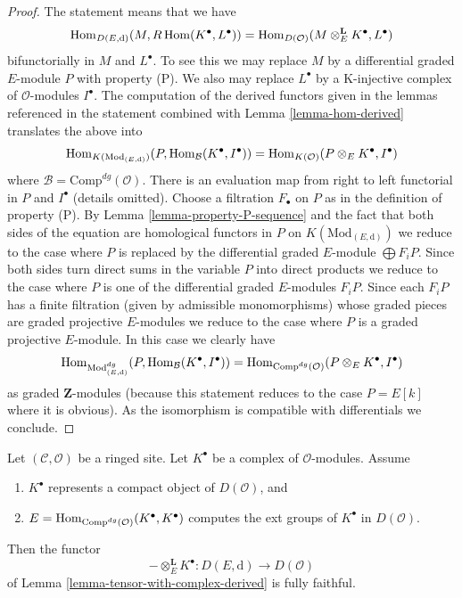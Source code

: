 \begin{proof}
The statement means that we have
$$
\mathop{\mathrm{Hom}}\nolimits_{D(E, \text{d})}(M, R\mathop{\mathrm{Hom}}\nolimits(K^\bullet, L^\bullet)) =
\mathop{\mathrm{Hom}}\nolimits_{D(\mathcal{O})}(M \otimes^\mathbf{L}_E K^\bullet, L^\bullet)
$$
bifunctorially in $M$ and $L^\bullet$. To see this we may replace $M$
by a differential graded $E$-module $P$ with property (P).
We also may replace $L^\bullet$ by a K-injective complex of
$\mathcal{O}$-modules $I^\bullet$. The computation
of the derived functors given in the lemmas referenced in the statement
combined with Lemma \ref{lemma-hom-derived} translates the above into
$$
\mathop{\mathrm{Hom}}\nolimits_{K(\text{Mod}_{(E, \text{d})})}
(P, \mathop{\mathrm{Hom}}\nolimits_\mathcal{B}(K^\bullet, I^\bullet)) =
\mathop{\mathrm{Hom}}\nolimits_{K(\mathcal{O})}(P \otimes_E K^\bullet, I^\bullet)
$$
where $\mathcal{B} = \text{Comp}^{dg}(\mathcal{O})$. 
There is an evaluation map from right to left functorial
in $P$ and $I^\bullet$ (details omitted).
Choose a filtration $F_\bullet$ on $P$ as in the definition of property (P).
By Lemma \ref{lemma-property-P-sequence} and the fact that
both sides of the equation are homological functors in $P$
on $K(\text{Mod}_{(E, \text{d})})$
we reduce to the case where $P$ is replaced by
the differential graded $E$-module $\bigoplus F_iP$.
Since both sides turn direct sums in the variable $P$
into direct products we reduce to the case where $P$ is one of the
differential graded $E$-modules $F_iP$.
Since each $F_iP$ has a finite filtration (given by admissible
monomorphisms) whose graded pieces are graded projective $E$-modules
we reduce to the case where $P$ is a graded projective $E$-module.
In this case we clearly have
$$
\mathop{\mathrm{Hom}}\nolimits_{\text{Mod}^{dg}_{(E, \text{d})}}
(P, \mathop{\mathrm{Hom}}\nolimits_\mathcal{B}(K^\bullet, I^\bullet)) =
\mathop{\mathrm{Hom}}\nolimits_{\text{Comp}^{dg}(\mathcal{O})}(P \otimes_E K^\bullet, I^\bullet)
$$
as graded $\mathbf{Z}$-modules (because this statement reduces to the case
$P = E[k]$ where it is obvious). As the isomorphism is compatible with
differentials we conclude.
\end{proof}

\begin{lemma}
\label{lemma-fully-faithful-in-compact-case}
Let $(\mathcal{C}, \mathcal{O})$ be a ringed site.
Let $K^\bullet$ be a complex of $\mathcal{O}$-modules.
Assume
\begin{enumerate}
\item $K^\bullet$ represents a compact object of $D(\mathcal{O})$, and
\item $E = \mathop{\mathrm{Hom}}\nolimits_{\text{Comp}^{dg}(\mathcal{O})}(K^\bullet, K^\bullet)$
computes the ext groups of $K^\bullet$ in $D(\mathcal{O})$.
\end{enumerate}
Then the functor
$$
- \otimes_E^\mathbf{L} K^\bullet :
D(E, \text{d})
\longrightarrow
D(\mathcal{O})
$$
of Lemma \ref{lemma-tensor-with-complex-derived} is fully faithful.
\end{lemma}

